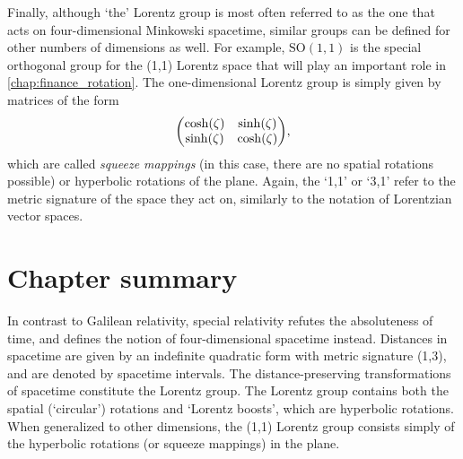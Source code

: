 Finally, although `the' Lorentz group is most often referred to as the one that acts on four-dimensional Minkowski spacetime, similar groups can be defined for other numbers of dimensions as well. For example, $\text{SO}(1, 1)$ is the special orthogonal group for the (1,1) Lorentz space that will play an important role in \cref{chap:finance_rotation}. The one-dimensional Lorentz group is simply given by matrices of the form
$$ \mqty(\cosh(\zeta) & \sinh(\zeta)\\\sinh(\zeta)&\cosh(\zeta)), $$
which are called \emph{squeeze mappings} (in this case, there are no spatial rotations possible) or hyperbolic rotations of the plane. Again, the `1,1' or `3,1' refer to the metric signature of the space they act on, similarly to the notation of Lorentzian vector spaces.

\section*{Chapter summary}
In contrast to Galilean relativity, special relativity refutes the absoluteness of time, and defines the notion of four-dimensional spacetime instead. Distances in spacetime are given by an indefinite quadratic form with metric signature (1,3), and are denoted by spacetime intervals. The distance-preserving transformations of spacetime constitute the Lorentz group. The Lorentz group contains both the spatial (`circular') rotations and `Lorentz boosts', which are hyperbolic rotations. When generalized to other dimensions, the (1,1) Lorentz group consists simply of the hyperbolic rotations (or squeeze mappings) in the plane.
